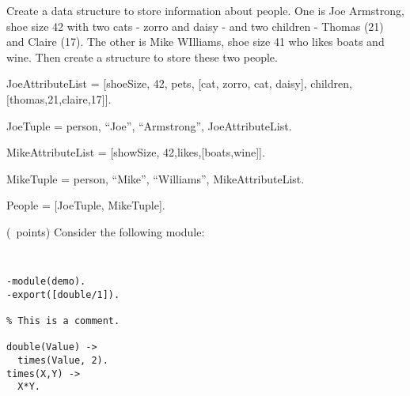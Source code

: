 \begin{questions}
    \question[8] Create a data structure to store information about
    people. One is Joe Armstrong, shoe size 42 with two cats - zorro
    and daisy - and two children - Thomas (21) and Claire (17). The
    other is Mike WIlliams, shoe size 41 who likes boats and
    wine. Then create a structure to store these two people.

    \begin{solution}
    {\tt 

    JoeAttributeList = [{shoeSize, 42}, {pets, [{cat, zorro},
    {cat, daisy}]}, {children, [{thomas,21},{claire,17}]}].
   
    JoeTuple = {person, ``Joe'', ``Armstrong'', JoeAttributeList}.

    MikeAttributeList = [{showSize, 42},{likes,[boats,wine]}].

    MikeTuple = {person, ``Mike'', ``Williams'', MikeAttributeList}.

    People = [JoeTuple, MikeTuple].
    }
    \end{solution}

    \question (\totalpoints\ points) Consider the following module:
{\tt
\begin{verbatim}
-module(demo).
-export([double/1]).

% This is a comment.

double(Value) ->
  times(Value, 2).
times(X,Y) ->
  X*Y.
\end{verbatim}
}


\end{questions}
